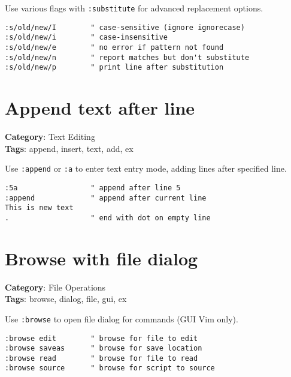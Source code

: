 {{{{{Use various flags with {\footnotesize \Verb§:substitute§} for advanced replacement options.

\begin{Exa*}{}
\begin{Verbatim}[fontsize=\footnotesize, breaklines, breakanywhere]
:s/old/new/I        " case-sensitive (ignore ignorecase)
:s/old/new/i        " case-insensitive
:s/old/new/e        " no error if pattern not found
:s/old/new/n        " report matches but don't substitute
:s/old/new/p        " print line after substitution
\end{Verbatim}
\end{Exa*}

\section{Append text after line}

\textbf{Category}: Text Editing\\ \textbf{Tags}: append, insert, text, add, ex
\vspace{0.5cm}

Use {\footnotesize \Verb§:append§} or {\footnotesize \Verb§:a§} to enter text entry mode, adding lines after specified line.

\begin{Exa*}{}
\begin{Verbatim}[fontsize=\footnotesize, breaklines, breakanywhere]
:5a                 " append after line 5
:append             " append after current line
This is new text
.                   " end with dot on empty line
\end{Verbatim}
\end{Exa*}

\section{Browse with file dialog}

\textbf{Category}: File Operations\\ \textbf{Tags}: browse, dialog, file, gui, ex
\vspace{0.5cm}

Use {\footnotesize \Verb§:browse§} to open file dialog for commands (GUI Vim only).

\begin{Exa*}{}
\begin{Verbatim}[fontsize=\footnotesize, breaklines, breakanywhere]
:browse edit        " browse for file to edit
:browse saveas      " browse for save location
:browse read        " browse for file to read
:browse source      " browse for script to source
\end{Verbatim}
\end{Exa*}

}}}}}
